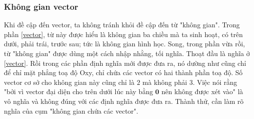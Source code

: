 \subsubsection*{Không gian vector}
Khi đề cập đến vector, ta không tránh khỏi đề cập đến từ "không gian". Trong phần \ref{vector}, từ này được hiểu là không gian ba chiều mà ta sinh hoạt, có trên dưới, phải trái, trước sau; tức là không gian hình học. Song, trong phần vừa rồi, từ "không gian" được dùng một cách nhập nhằng, tối nghĩa. Thoạt đầu là nghĩa ở \ref{vector}. Rồi trong các phần định nghĩa mới được đưa ra, nó dường như cũng chỉ để chỉ mặt phẳng toạ độ Oxy, chỉ chứa các vector có hai thành phần toạ độ. Số vector cơ sở cho không gian này cũng chỉ là \(2\) mà không phải \(3\). Việc nói rằng "bởi vì vector đại diện cho trên dưới lúc này bằng \(\mathbf{0}\) nên không được xét vào" là vô nghĩa và không đúng với các định nghĩa được đưa ra. 
Thành thử, cần làm rõ nghĩa của cụm "không gian chứa các vector".
\vspace{8pt}


